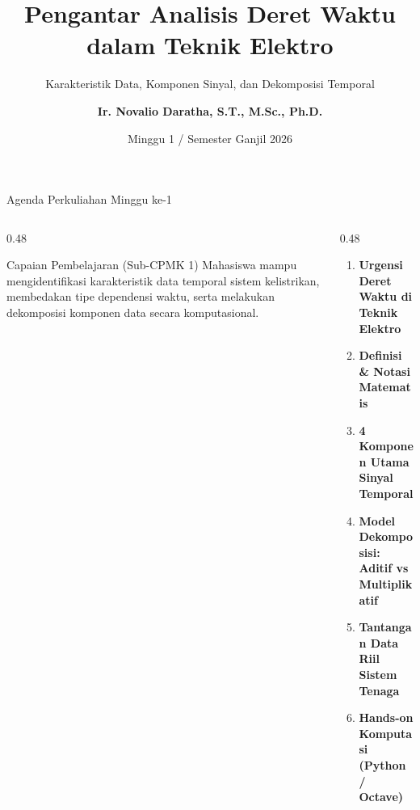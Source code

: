 \documentclass[aspectratio=169, 10pt]{beamer}
\title[\textbf{Deret Waktu (Minggu 1)}]{\textbf{Pengantar Analisis Deret Waktu dalam Teknik Elektro}}
\subtitle{Karakteristik Data, Komponen Sinyal, dan Dekomposisi Temporal}
\author[\textbf{Ir. Novalio Daratha, Ph.D.}]{\textbf{Ir. Novalio Daratha, S.T., M.Sc., Ph.D.}}
\institute[FT UNIB]{Program Studi Teknik Elektro -- Fakultas Teknik\\Universitas Bengkulu}
\date{Minggu 1 / Semester Ganjil 2026}
\begin{document}
\begin{frame}[plain]
    \titlepage
\end{frame}

\begin{frame}{Agenda Perkuliahan Minggu ke-1}
    \begin{columns}[T]
        \begin{column}{0.48\textwidth}
            \begin{block}{Capaian Pembelajaran (Sub-CPMK 1)}
                Mahasiswa mampu mengidentifikasi karakteristik data temporal sistem kelistrikan, membedakan tipe dependensi waktu, serta melakukan dekomposisi komponen data secara komputasional.
            \end{block}
        \end{column}
        \begin{column}{0.48\textwidth}
            \begin{enumerate}
                \item \textbf{Urgensi Deret Waktu di Teknik Elektro}
                \item \textbf{Definisi \& Notasi Matematis}
                \item \textbf{4 Komponen Utama Sinyal Temporal}
                \item \textbf{Model Dekomposisi: Aditif vs Multiplikatif}
                \item \textbf{Tantangan Data Riil Sistem Tenaga}
                \item \textbf{Hands-on Komputasi (Python / Octave)}
            \end{enumerate}
        \end{column}
    \end{columns}
\end{frame}
\end{document}
